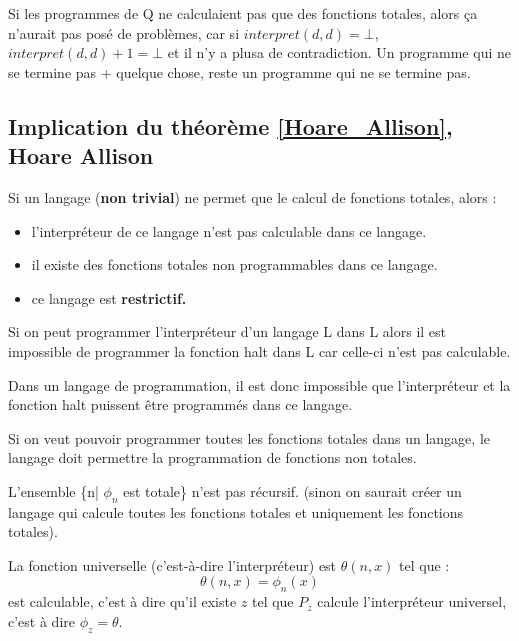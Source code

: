 \begin{myrem}
	Si les programmes de Q ne calculaient pas que des fonctions totales, alors ça n'aurait pas posé de problèmes, car si $interpret(d,d)=\bot$, $interpret(d,d)+1=\bot$ et il n'y a plusa de contradiction.  Un programme qui ne se termine pas + quelque chose, reste un programme qui ne se termine pas.
\end{myrem}

\subsection{Implication du théorème \ref{Hoare_Allison}, Hoare Allison }

\begin{myprop}
	Si un langage (\textbf{non trivial}) ne permet que le calcul de fonctions totales, alors :
	\begin{itemize}
		\item l'interpréteur de ce langage n'est pas calculable dans ce langage.
		\item il existe des fonctions totales non programmables dans ce langage.
		\item ce langage est \bf{restrictif}.
	\end{itemize}
\end{myprop}

\begin{myprop}
	Si on peut programmer l'interpréteur d'un langage L dans L alors il est
	impossible de programmer la fonction halt dans L car celle-ci n'est pas calculable.
\end{myprop}

\begin{myprop}
	Dans un langage de programmation, il est donc impossible que
	l'interpréteur et la fonction halt puissent être programmés dans ce langage.
\end{myprop}

\begin{myprop}
	Si on veut pouvoir programmer toutes les fonctions totales dans un langage, le langage doit permettre la programmation de fonctions non totales.
\end{myprop}

\begin{myprop}
	L'ensemble \{n| $\phi_n$ est totale\} n'est pas récursif.
    (sinon on saurait créer un langage qui calcule toutes les fonctions totales et uniquement les fonctions totales).
\end{myprop}

\begin{mytheo}
  \label{theo:fununiv}
	La fonction universelle (c'est-à-dire l'interpréteur) est $\theta(n,x)$ tel que :
	\[ \theta(n,x) = \phi_n(x) \]
    est calculable, c'est à dire qu'il existe $z$ tel que $P_z$ calcule l'interpréteur universel,
    c'est à dire $\phi_z = \theta$.
\end{mytheo}

